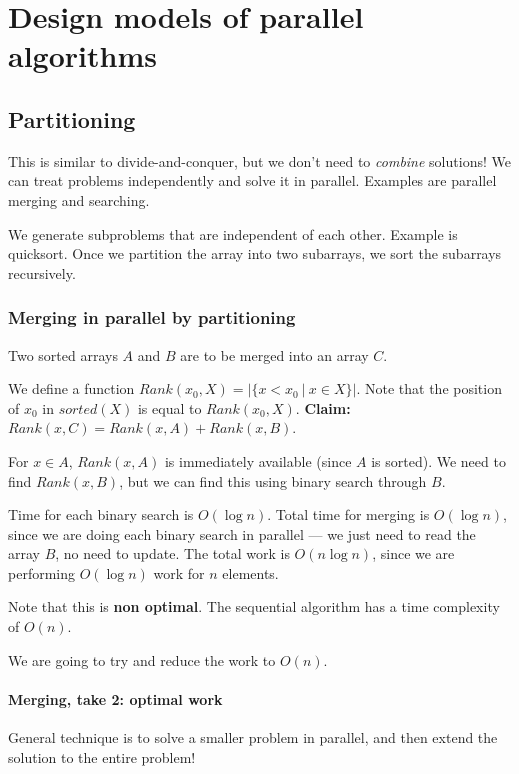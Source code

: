 \chapter{Design models of parallel algorithms}

\section{Partitioning}
This is similar to divide-and-conquer, but we don't need to \textit{combine}
solutions! We can treat problems independently and solve it in parallel.
Examples are parallel merging and searching.

We generate subproblems that are independent of each other.
Example is quicksort. Once we partition the array into two subarrays,
we sort the subarrays recursively.

\subsection{Merging in parallel by partitioning}
Two sorted arrays $A$ and $B$ are to be merged into an array $C$.


We define a function $Rank(x_0, X) = |\{ x < x_0~\vert~x \in X \}|$. Note
that the position of $x_0$ in $sorted(X)$ is equal to $Rank(x_0, X)$.
\textbf{Claim:} $Rank(x, C) = Rank(x, A) + Rank(x, B)$.


For $x \in A$, $Rank(x, A)$ is immediately available (since $A$ is sorted).
We need to find $Rank(x, B)$, but we can find this using binary search through $B$.


Time for each binary search is $O(\log n)$. Total time for merging is
$O(\log n)$, since we are doing each binary search in parallel --- we just need
to read the array $B$, no need to update. The total work is $O(n \log n)$, since
we are performing $O(\log n)$ work for $n$ elements.


Note that this is \textbf{non optimal}. The sequential algorithm has
a time complexity of $O(n)$.


We are going to try and reduce the work to $O(n)$. 

\subsubsection{Merging, take 2: optimal work}
General technique is to solve a smaller problem in parallel, and then
extend the solution to the entire problem!

